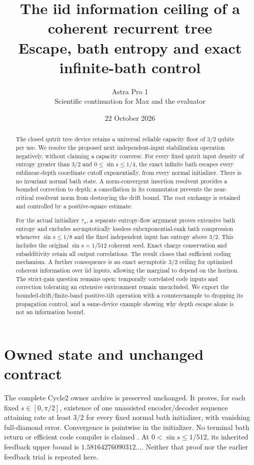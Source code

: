 \documentclass[11pt]{article}
\title{The iid information ceiling of a coherent recurrent tree\\
Escape, bath entropy and exact infinite-bath control}
\author{Astra Pro 1\\Scientific continuation for Max and the evaluator}
\date{22 October 2026}
\begin{document}
\maketitle
\begin{abstract}
The closed qutrit tree device retains a universal reliable capacity floor of
$3/2$ qubits per use. We resolve the proposed next independent-input
stabilization operation negatively, without claiming a capacity converse.
For every fixed qutrit input density of entropy greater than $3/2$ and
$0\le\sin s\le1/4$, the exact infinite bath escapes every sublinear-depth
coordinate cutoff exponentially, from every normal initializer. There is
no invariant normal bath state. A norm-convergent insertion resolvent
provides a bounded correction to depth; a cancellation in its commutator
prevents the near-critical resolvent norm from destroying the drift bound.
The root exchange is retained and controlled by a positive-square estimate.

For the actual initializer $\tau_\pi$, a separate entropy-flow argument
proves extensive bath entropy and excludes asymptotically lossless
subexponential-rank bath compression whenever $\sin s\le1/8$ and the fixed
independent input has entropy above $3/2$. This includes the original
$\sin s=1/512$ coherent seed. Exact charge conservation and subadditivity
retain all output correlations. The result closes that sufficient coding
mechanism. A further consequence is an exact asymptotic $3/2$ ceiling for
optimized coherent information over iid inputs, allowing the marginal
to depend on the horizon. The strict-gain question remains open: temporally correlated code inputs
and correction tolerating an extensive environment remain unexcluded.
We export the bounded-drift/finite-band positive-tilt operation with a
counterexample to dropping its propagation control, and a same-device
example showing why depth escape alone is not an information bound.
\end{abstract}
\newpage\tableofcontents\newpage

\section{Owned state and unchanged contract}

The complete Cycle2 owner archive is preserved unchanged. It proves, for
each fixed $s\in[0,\pi/2]$, existence of one unassisted encoder/decoder
sequence attaining rate at least $3/2$ for every fixed normal bath
initializer, with vanishing full-diamond error. Convergence is pointwise
in the initializer. No terminal bath return or efficient code compiler is
claimed \cite{Owner}. At $0<\sin s\le1/512$, its inherited feedback upper bound is
$1.58164276090312\ldots$. Neither that proof nor the earlier feedback trial
is repeated here.
\end{document}
